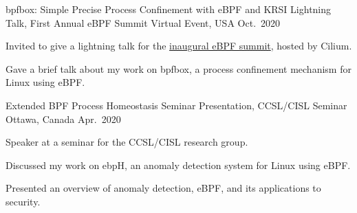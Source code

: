 \begin{cventries}
  \cventry
    {bpfbox: Simple Precise Process Confinement with eBPF and KRSI} %
    {Lightning Talk, First Annual eBPF Summit} %
    {Virtual Event, USA} %
    {Oct.~2020} %
    {
      \begin{cvitems} %
        \item Invited to give a lightning talk for the \href{https://ebpf.io/summit-2020/\#lightning-talks}{inaugural eBPF summit}, hosted by Cilium.
        \item Gave a brief talk about my work on bpfbox, a process confinement mechanism for Linux using eBPF.
      \end{cvitems}
    }

  \cventry
    {Extended BPF Process Homeostasis} %
    {Seminar Presentation, CCSL/CISL Seminar} %
    {Ottawa, Canada} %
    {Apr.~2020} %
    {
      \begin{cvitems} %
        \item Speaker at a seminar for the CCSL/CISL research group.
        \item Discussed my work on ebpH, an anomaly detection system for Linux using eBPF.
        \item Presented an overview of anomaly detection, eBPF, and its applications to security.
      \end{cvitems}
    }

\end{cventries}
